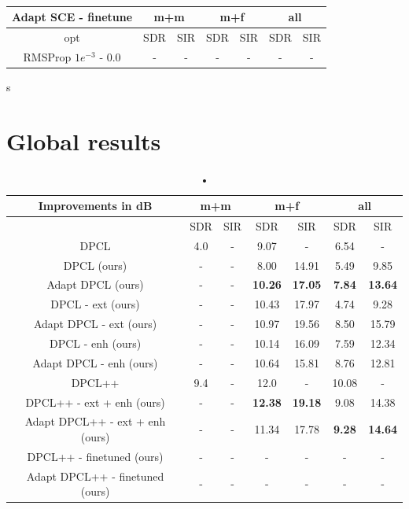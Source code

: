 \documentclass[master, tikz, final,11pt, dvipdfmx]{iscs-thesis}
\begin{document}
\begin{table}[h]
\begin{tabular}{c|c|c|c|c|c|c}
Adapt SCE - finetune & \multicolumn{2}{c|}{m+m} & \multicolumn{2}{c|}{m+f} & \multicolumn{2}{c}{all} \\ 
\hline 
opt & SDR & SIR & SDR & SIR & SDR & SIR \\ 
\hline
RMSProp $1e^{-3}$ - 0.0  & - & - & - & - & - & - \\ 
\end{tabular}s
\caption{}
\end{table}



\section{Global results}




\begin{table}[h]

\begin{tabular}{c|c|c|c|c|c|c}
Improvements in dB & \multicolumn{2}{c|}{m+m} & \multicolumn{2}{c|}{m+f} & \multicolumn{2}{c}{all} \\ 
\hline 
 & SDR & SIR & SDR & SIR & SDR & SIR \\ 
\hline 
DPCL \cite{DPCLV1} & 4.0 & - & 9.07 & - & 6.54 & - \\ 
\hline 
DPCL (ours) & - & - & 8.00 & 14.91 & 5.49 & 9.85 \\ 
\hline 
Adapt DPCL (ours) & - & - & \textbf{10.26} & \textbf{17.05} & \textbf{7.84} & \textbf{13.64} \\ 
\hline 
\hline 
DPCL - ext (ours) & - & - & 10.43 & 17.97 & 4.74 & 9.28 \\ 
\hline 
Adapt DPCL - ext (ours) & - & - & 10.97 & 19.56 & 8.50 & 15.79 \\ 
\hline 
\hline 
DPCL - enh (ours) & - & - & 10.14 & 16.09 & 
7.59 & 12.34 \\ 
\hline 
Adapt DPCL - enh (ours) & - & - & 10.64 & 15.81 & 
8.76 & 12.81 \\ 
\hline
\hline 
DPCL++ \cite{DPCLV2} & 9.4 & - & 12.0 & - & 10.08 & - \\ 
\hline 
DPCL++ - ext + enh (ours) & - & - & \textbf{12.38} & \textbf{19.18} & 9.08 & 14.38 \\ 
\hline 
Adapt DPCL++ - ext + enh (ours) & - & - & 11.34 & 17.78 & \textbf{9.28} & \textbf{14.64} \\ 
\hline 
\hline 
DPCL++ - finetuned (ours) & - & - & - & - & - & - \\ 
Adapt DPCL++ - finetuned (ours) & - & - & - & - & - & - \\ 
\end{tabular}
\caption{•}
\end{table}
\end{document}
